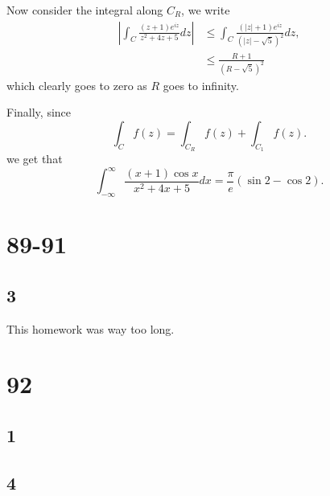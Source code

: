 \documentclass{article}
\begin{document}
Now consider the integral along $C_R$, we write
\begin{align*}
    \left|\int_C \frac{(z+1)e^{iz}}{z^2 + 4z + 5}dz\right| & \leq
    \int_C \frac{(|z|+1)e^{iz}}{(|z| - \sqrt{5})^2}dz,                                           \\
                                                           & \leq \frac{R + 1}{(R - \sqrt{5})^2}
\end{align*}
which clearly goes to zero as $R$ goes to infinity.

Finally, since
\begin{equation*}
    \int_C f(z) = \int_{C_R} f(z) + \int_{C_1} f(z).
\end{equation*}
we get that
\begin{equation*}
    \int_{-\infty}^\infty \frac{(x+1)\cos x}{x^2 + 4x + 5}dx = \frac{\pi}{e}(\sin 2 - \cos 2).
\end{equation*}

\section*{89-91}
\subsection*{3}
This homework was way too long.

\section*{92}
\subsection*{1}
\subsection*{4}
\end{document}
